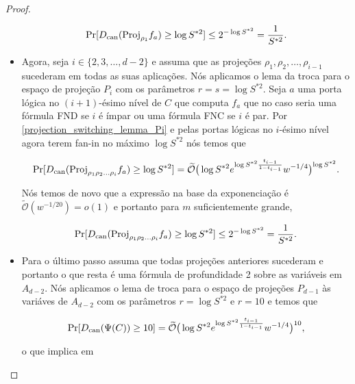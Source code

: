 \begin{proof}
\begin{itemize}
    \begin{equation*}
        \Pr[D_{\text{can}}(\text{Proj}_{\rho_{1}}f_{a}) \geq \log S^{* 2}] \leq 2^{-\log S^{* 2}} = \frac{1}{S^{* 2}}.
    \end{equation*}
    
    \item Agora, seja $i \in \{2, 3, \dots, d - 2\}$ e assuma que as projeções $\rho_{1}, \rho_{2}, \dots, \rho_{i - 1}$ sucederam em todas as suas aplicações. Nós aplicamos o lema da troca para o espaço de projeção $P_{i}$ com os parâmetros $r = s = \log S^{* 2}$. Seja $a$ uma porta lógica no $(i + 1)$-ésimo nível de $C$ que computa $f_{a}$ que no caso seria uma fórmula FND se $i$ é ímpar ou uma fórmula FNC se $i$ é par. Por \ref{projection_switching_lemma_Pi} e pelas portas lógicas no $i$-ésimo nível agora terem fan-in no máximo $\log S^{* 2}$ nós temos que
    
    \begin{equation*}
        \Pr[D_{\text{can}}(\text{Proj}_{\rho_{1}\rho_{2}\dots\rho_{i}}f_{a}) \geq \log S^{* 2}] = \widetilde{\mathcal{O}} \big( \log S^{* 2} e^{\log S^{* 2} \frac{t_{i - 1}}{1 - t_{i - 1}}} w^{-1/4} \big)^{\log S^{* 2}}.
    \end{equation*}
    
    Nós temos de novo que a expressão na base da exponenciação é $\widetilde{\mathcal{O}}(w^{-1/20}) = o(1)$ e portanto para $m$ suficientemente grande,
    
    \begin{equation*}
        \Pr[D_{\text{can}}(\text{Proj}_{\rho_{1}\rho_{2}\dots\rho_{i}}f_{a}) \geq \log S^{* 2}] \leq 2^{-\log S^{* 2}} = \frac{1}{S^{* 2}}.
    \end{equation*}    
    
    \item Para o último passo assuma que todas projeções anteriores sucederam e portanto o que resta é uma fórmula de profundidade 2 sobre as variáveis em $A_{d - 2}$. Nós aplicamos o lema de troca para o espaço de projeções $P_{d - 1}$ às variáves de $A_{d - 2}$ com os parâmetros $r = \log S^{* 2}$ e $r = 10$ e temos que
    
    \begin{equation} \label{last_projection_step}
        \Pr[D_{\text{can}}(\Psi(C)) \geq 10] = \widetilde{\mathcal{O}} \big( \log S^{* 2} e^{\log S^{* 2} \frac{t_{i - 1}}{1 - t_{i - 1}}} w^{-1/4} \big)^{10},
    \end{equation}
    
    o que implica em
    

\end{itemize}
\end{proof}
